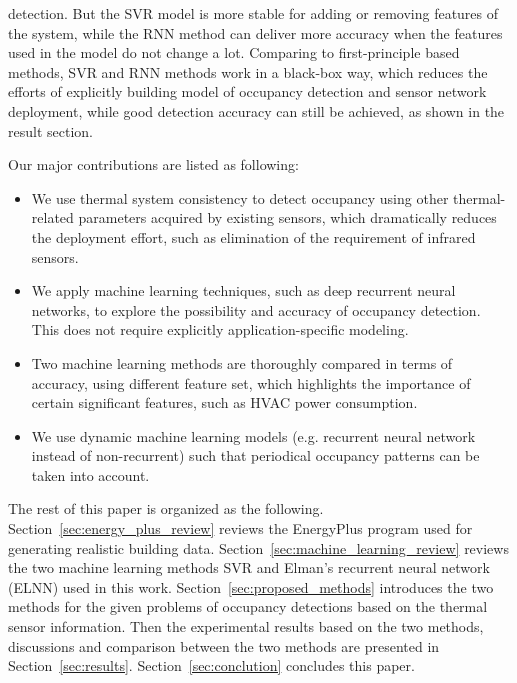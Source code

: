 detection. \textcolor{feb18rev}{But the SVR model is more stable for
  adding or removing features of the system, while the RNN method can
  deliver more accuracy when the features used in the model do not
  change a lot. Comparing to first-principle based methods, SVR and
  RNN methods work in a black-box way, which reduces the efforts of
  explicitly building model of occupancy detection and sensor network
  deployment, while good detection accuracy can still be achieved, as
  shown in the result section.} \textcolor{feb18rev}{Our major
  contributions are listed as following:
\begin{itemize}
\item We use thermal system consistency to detect occupancy using other
    thermal-related parameters acquired by existing sensors, which dramatically
    reduces the deployment effort, such as elimination of the requirement
    of infrared sensors.
\item We apply machine learning techniques, such as deep recurrent neural
    networks, to explore the possibility and accuracy of occupancy detection.
    This does not require explicitly application-specific modeling.
\item Two machine learning methods are thoroughly compared in terms of accuracy,
    using different feature set, which highlights the importance of certain
    significant features, such as HVAC power consumption.
\item We use dynamic machine learning models (e.g. recurrent neural network
    instead of non-recurrent) such that periodical occupancy patterns can be taken
    into account.
\end{itemize}
}

The rest of this paper is organized as the following.
Section~\ref{sec:energy_plus_review} reviews the EnergyPlus program used for
generating realistic building data. Section~\ref{sec:machine_learning_review}
reviews the two machine learning methods SVR and Elman's recurrent neural
network (ELNN) used in this work. Section~\ref{sec:proposed_methods} introduces
the two methods for the given problems of occupancy detections based on the
thermal sensor information. Then the experimental results based on the two
methods, discussions and comparison between the two methods are presented in
Section~\ref{sec:results}. Section~\ref{sec:conclution} concludes this paper.
